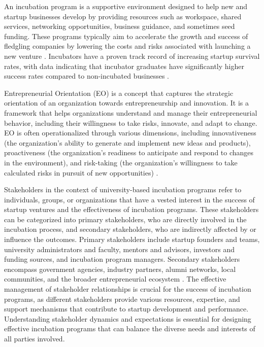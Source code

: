 \documentclass[../Main.tex]{subfiles}
\begin{document}
An incubation program is a supportive environment designed to help new and startup businesses develop by providing resources such as workspace, shared services, networking opportunities, business guidance, and sometimes seed funding. These programs typically aim to accelerate the growth and success of fledgling companies by lowering the costs and risks associated with launching a new venture \cite{hackett2004business,europeancommission2014incubators}. Incubators have a proven track record of increasing startup survival rates, with data indicating that incubator graduates have significantly higher success rates compared to non-incubated businesses \cite{NBIA2012}.

Entrepreneurial Orientation (EO) is a concept that captures the strategic orientation of an organization towards entrepreneurship and innovation. It is a framework that helps organizations understand and manage their entrepreneurial behavior, including their willingness to take risks, innovate, and adapt to change. EO is often operationalized through various dimensions, including innovativeness (the organization's ability to generate and implement new ideas and products), proactiveness (the organization's readiness to anticipate and respond to changes in the environment), and risk-taking (the organization's willingness to take calculated risks in pursuit of new opportunities) \cite{wiklund2005entrepreneurial}.

Stakeholders in the context of university-based incubation programs refer to individuals, groups, or organizations that have a vested interest in the success of startup ventures and the effectiveness of incubation programs. These stakeholders can be categorized into primary stakeholders, who are directly involved in the incubation process, and secondary stakeholders, who are indirectly affected by or influence the outcomes. Primary stakeholders include startup founders and teams, university administrators and faculty, mentors and advisors, investors and funding sources, and incubation program managers. Secondary stakeholders encompass government agencies, industry partners, alumni networks, local communities, and the broader entrepreneurial ecosystem \cite{freeman1984strategic, mitchell1997toward}. The effective management of stakeholder relationships is crucial for the success of incubation programs, as different stakeholders provide various resources, expertise, and support mechanisms that contribute to startup development and performance. Understanding stakeholder dynamics and expectations is essential for designing effective incubation programs that can balance the diverse needs and interests of all parties involved.
\end{document}
